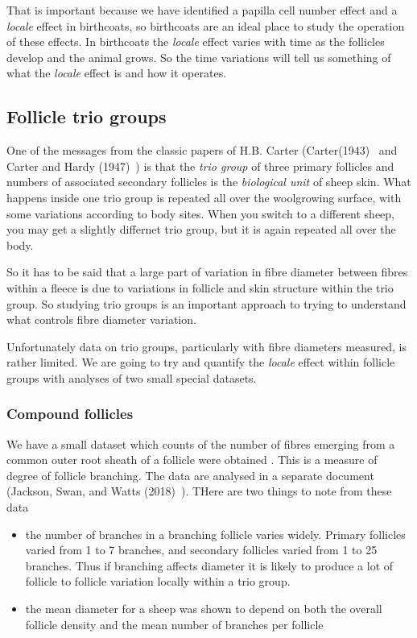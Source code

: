 \documentclass[titlepage]{article}  %
\begin{document}
That is important because  we have identified a papilla cell number effect and a {\em locale} effect in birthcoats, so birthcoats are an ideal place to study the operation of these effects. In birthcoats the {\em locale} effect varies with time as the follicles develop and the animal grows. So the time variations will tell us something of what the {\em locale} effect is and how it operates. 




\subsection{Follicle trio groups}
One of the messages from the classic papers of H.B. Carter (Carter(1943)~\cite{cart:43} and Carter and Hardy (1947)~\cite{cart:47}) is that the {\em trio group} of three primary follicles and numbers of associated secondary follicles is the {\em biological unit} of sheep skin. What happens inside one trio group is repeated all over the woolgrowing surface, with some variations according to body sites. When you switch to  a different sheep, you may get a slightly differnet trio group, but it is again repeated all over the body.

So it has to be said that a large part of variation in fibre diameter between fibres within a fleece is due to variations in follicle and skin structure within the trio group. So studying trio groups is an important approach to trying to understand what controls fibre diameter variation. 

Unfortunately data on trio groups, particularly with fibre diameters measured, is rather limited.  We are going to try and quantify the {\em locale} effect within follicle groups with analyses of two small special datasets.

\subsubsection{Compound follicles}
We have a small dataset  which counts of the number of fibres emerging from a common outer root sheath of a follicle were obtained .  This is a measure of degree of follicle branching. The data are analysed in a separate document (Jackson, Swan, and Watts (2018)~\cite{jack:18c}). THere are two things to note from these data
\begin{itemize}
\item the number of branches in a branching follicle varies widely. Primary follicles varied from 1 to 7 branches, and secondary follicles varied from 1 to 25 branches. Thus if branching affects diameter it is likely to produce a lot of follicle to follicle variation locally within a trio group.
\item the mean diameter for a sheep was shown to depend on both the overall follicle density and the mean number of branches per follicle
\end{itemize}
\end{document}
